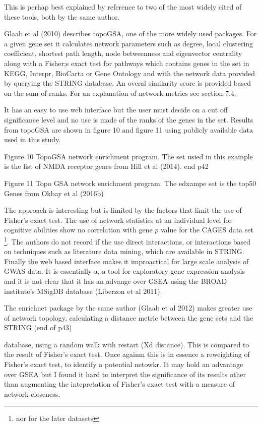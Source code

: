 This is perhap best explained by reference to two of the most widely cited of these tools, both by the same author. 

Glaab et al (2010) describes topoGSA, one of the more widely used packages. For a given gene set it calculates network parameters such as degree, local clustering coefficient, shortest path length, node betweenness and eigenvector centrality along with a Fisher;s exact test for pathways which contains genes in the set in KEGG, Interpr, BioCarta or Gene Ontology and with the network data provided by querying the STRING database. An overal similarity score is provided based on the sum of ranks. For an explanation of network metrics see section 7.4.

It has an easy to use web interface but the user must decide on a cut off significance level and no use is made of the ranks of the genes in the set. Results from topoGSA are shown in figure 10 and figure 11 using publicly available data used in this study.

Figure 10 TopoGSA network enrichment program. The set usied in this example is the list of NMDA receptor genes from Hill et al (2014). end p42

Figure 11 Topo GSA network enrichment program. The edxampe set is the top50 Genes from Okbay et al (2016b)

The approach is interesting but is limited by the factors that limit the use of Fisher's exact test. The use of network statistics at an individual level for cognitive abilities show no correlation with gene $p$ value for the CAGES data set \footnote{nor for the later datasets}. The authors do not record if the use direct interactions, or interactions based on techniques such as literature data mining, which are available in STRING. Finally the web based interface makes it improactical for large scale analysis of GWAS data. It is essentially a, a tool for exploratory gene expression analysis and it is not clear that it has an advange over GSEA using the BROAD institute's MSigDB database (Liberzon et al 2011). 

The enrichnet package by the same author (Glaab et al 2012) makes greater use of network topology, calculating a distance metric between the gene sets and the STRING (end of p43)

database, using a random walk with restart (Xd distance). This is compared to the result of Fisher's exact test. Once againm this is in essence a reweighting of Fisher's exact test, to identify a potential netowkr. It may hold an advantage over GSEA but I found it hard to interpret the significance of its results other than augmenting the intepretation of Fisher's exact test with a measure of network closeness.

